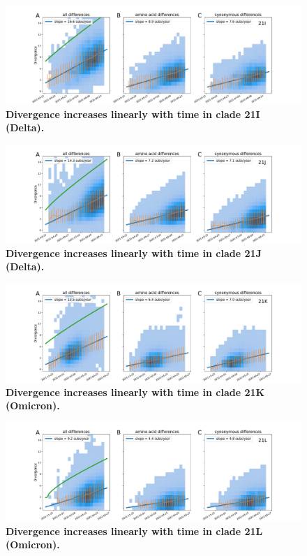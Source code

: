 \begin{figure}[h]
    \includegraphics[width=\textwidth]{figures/rtt/21I_rtt.pdf}
    \caption{{\bf Divergence increases linearly with time in clade 21I (Delta).}
    \label{fig:21I_divergence}}
\end{figure}

\begin{figure}[h]
    \includegraphics[width=\textwidth]{figures/rtt/21J_rtt.pdf}
    \caption{{\bf Divergence increases linearly with time in clade 21J (Delta).}
    \label{fig:21J_divergence}}
\end{figure}

\begin{figure}[h]
    \includegraphics[width=\textwidth]{figures/rtt/21K_rtt.pdf}
    \caption{{\bf Divergence increases linearly with time in clade 21K (Omicron).}
    \label{fig:21K_divergence}}
\end{figure}

\begin{figure}[h]
    \includegraphics[width=\textwidth]{figures/rtt/21L_rtt.pdf}
    \caption{{\bf Divergence increases linearly with time in clade 21L (Omicron).}
    \label{fig:21L_divergence}}
\end{figure}


